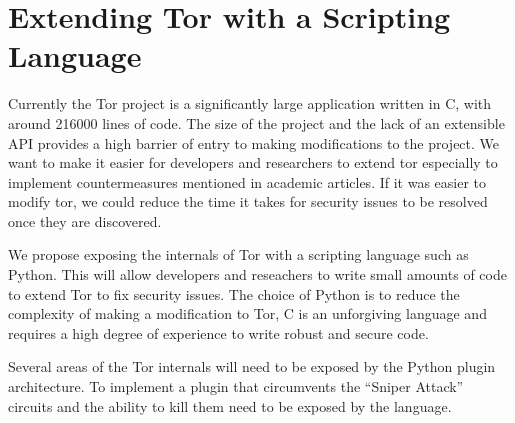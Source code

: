 \documentclass[9pt,technote]{IEEEtran}
\begin{document}
\section{Extending Tor with a Scripting Language}
Currently the Tor project is a significantly large application written in C,
with around 216000 lines of code. The size of the project and the lack of an
extensible API provides a high barrier of entry to making modifications to the
project. We want to make it easier for developers and researchers to extend tor
especially to implement countermeasures mentioned in academic articles. If it
was easier to modify tor, we could reduce the time it takes for security issues
to be resolved once they are discovered.

We propose exposing the internals of Tor with a scripting language such as
Python. This will allow developers and reseachers to write small amounts of code to extend Tor to fix security issues. The choice of Python is to reduce the complexity of making a modification to Tor, C is an unforgiving language and requires a high degree of experience to write robust and secure code.

Several areas of the Tor internals will need to be exposed by the Python plugin
architecture. To implement a plugin that circumvents the ``Sniper Attack''
circuits and the ability to kill them need to be exposed by the language.



\end{document}
